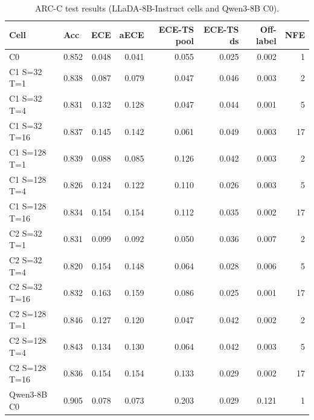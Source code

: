 \begin{table}[h!]
\centering
\small
\caption{ARC-C test results (LLaDA-8B-Instruct cells and Qwen3-8B C0).}
\label{tab:main_arc_c}
\begin{tabular}{llrrrrrr}
\toprule
Cell & Acc & ECE & aECE & ECE-TS pool & ECE-TS ds & Off-label & NFE \\
\midrule
C0 & 0.852 & 0.048 & 0.041 & 0.055 & 0.025 & 0.002 & 1 \\
C1 S=32 T=1 & 0.838 & 0.087 & 0.079 & 0.047 & 0.046 & 0.003 & 2 \\
C1 S=32 T=4 & 0.831 & 0.132 & 0.128 & 0.047 & 0.044 & 0.001 & 5 \\
C1 S=32 T=16 & 0.837 & 0.145 & 0.142 & 0.061 & 0.049 & 0.003 & 17 \\
C1 S=128 T=1 & 0.839 & 0.088 & 0.085 & 0.126 & 0.042 & 0.003 & 2 \\
C1 S=128 T=4 & 0.826 & 0.124 & 0.122 & 0.110 & 0.026 & 0.003 & 5 \\
C1 S=128 T=16 & 0.834 & 0.154 & 0.154 & 0.112 & 0.035 & 0.002 & 17 \\
C2 S=32 T=1 & 0.831 & 0.099 & 0.092 & 0.050 & 0.036 & 0.007 & 2 \\
C2 S=32 T=4 & 0.820 & 0.154 & 0.148 & 0.064 & 0.028 & 0.006 & 5 \\
C2 S=32 T=16 & 0.832 & 0.163 & 0.159 & 0.086 & 0.025 & 0.001 & 17 \\
C2 S=128 T=1 & 0.846 & 0.127 & 0.120 & 0.047 & 0.042 & 0.002 & 2 \\
C2 S=128 T=4 & 0.843 & 0.134 & 0.130 & 0.064 & 0.042 & 0.003 & 5 \\
C2 S=128 T=16 & 0.836 & 0.154 & 0.154 & 0.133 & 0.029 & 0.002 & 17 \\
Qwen3-8B C0 & 0.905 & 0.078 & 0.073 & 0.203 & 0.029 & 0.121 & 1 \\
\bottomrule
\end{tabular}
\end{table}
